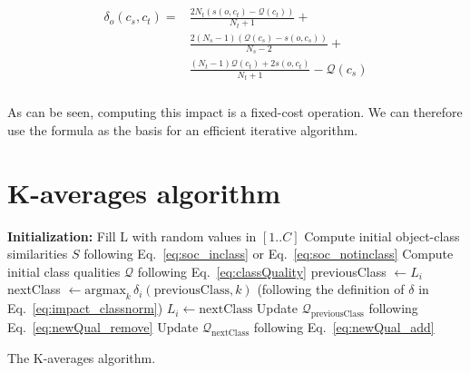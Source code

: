 \documentclass[10pt,letterpaper]{article}
\begin{document}
\begin{align}
\begin{split}
  \delta_o(c_s, c_t) = & \frac{2N_t \left(s\left(o, c_t\right)-\mathcal{Q}(c_t)\right)}{N_t+1} + \\
&  \frac{2(N_s-1)\left( \mathcal{Q}(c_s) - s\left(o, c_s\right)\right)}{N_s-2}  + \\
 &  \frac{(N_t-1) \mathcal{Q}(c_t)  + 2s\left(o, c_t\right)}{N_t+1} - \mathcal{Q}(c_s) \\
\end{split}
  \label{eq:impact_classnorm}
\end{align}

As can be seen, computing this impact is a fixed-cost operation. We can therefore use the formula as the basis for an efficient iterative algorithm.

\section{K-averages algorithm}
\label{sec:algo}

\begin{algorithm}[h!]
	\SetAlgoLined
	\BlankLine
	\textbf{Initialization:}
		Fill L with random values in $[1..C]$\;
		Compute initial object-class similarities $S$ following Eq.~\ref{eq:soc_inclass} or Eq.~\ref{eq:soc_notinclass}\;
		Compute initial class qualities $\mathcal{Q}$ following Eq.~\ref{eq:classQuality}\;
	\BlankLine
	 {
		 {
			previousClass $\leftarrow L_i$\;
			nextClass $\leftarrow \mathrm{argmax}_k\,\delta_i(\mathrm{previousClass}, k)$ \label{algline:kaverages_search}
			(following the definition of $\delta$ in Eq.~\ref{eq:impact_classnorm})\; %
			 {
				$L_i \leftarrow \mathrm{nextClass}$\;
				Update $\mathcal{Q}_\mathrm{previousClass}$ following Eq.~\ref{eq:newQual_remove}\;
				Update $\mathcal{Q}_\mathrm{nextClass}$ following Eq.~\ref{eq:newQual_add}\;
			}
		}
	}
	\BlankLine
	\caption{The K-averages algorithm.}
  \label{algo:kaverages}
\end{algorithm}
\end{document}
